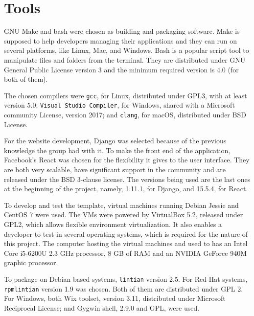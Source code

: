 \section{Tools}
\label{sec:tools}

GNU Make and bash were chosen as building and packaging software. Make is supposed to help developers managing their applications and they can run on several platforms, like Linux, Mac, and Windows. Bash is a popular script tool to manipulate files and folders from the terminal. They are distributed under GNU General Public License version 3 and the minimum required version is 4.0 (for both of them).

The chosen compilers were \texttt{gcc}, for Linux, distributed under GPL3, with at least version 5.0; \texttt{Visual Studio Compiler}, for Windows, shared with a Microsoft community License, version 2017; and \texttt{clang}, for macOS, distributed under BSD License.

For the website development, Django was selected because of the previous knowledge the group had with it. To make the front end of the application, Facebook's React was chosen for the flexibility it gives to the user interface. They are both very scalable, have significant support in the community and are released under the BSD 3-clause license. The versions being used are the last ones at the beginning of the project, namely, 1.11.1, for Django, and 15.5.4, for React.

To develop and test the template, virtual machines running Debian Jessie and CentOS 7 were used. The VMs were powered by VirtualBox 5.2, released under GPL2, which allows flexible environment virtualization. It also enables a developer to test in several operating systems, which is required for the nature of this project. The computer hosting the virtual machines and used to has an Intel Core i5-6200U 2.3 GHz processor, 8 GB of RAM and an NVIDIA GeForce 940M graphic processor.

To package on Debian based systems, \texttt{lintian} version 2.5. For Red-Hat systems, \texttt{rpmlintian} version 1.9 was chosen. Both of them are distributed under GPL 2. For Windows, both Wix toolset, version 3.11, distributed under Microsoft Reciprocal License; and Gygwin shell, 2.9.0 and GPL, were used.
